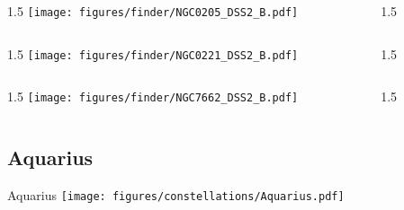 \documentclass[final]{beamer}
\newlength{\colwidth}
\begin{document}
\begin{frame}[t]{}
  \begin{columns}[T]
    \begin{column}{1.5\colwidth}
      \centering
      \texttt{[image: figures/finder/NGC0205\_DSS2\_B.pdf]}
    \end{column}
    \begin{column}{1.5\colwidth}
      \Large
      
    \end{column}
  \end{columns}
  \vspace{\fill}
  \begin{columns}[T]
    \begin{column}{1.5\colwidth}
      \centering
      \texttt{[image: figures/finder/NGC0221\_DSS2\_B.pdf]}
    \end{column}
    \begin{column}{1.5\colwidth}
      \Large
      
    \end{column}
  \end{columns}
\end{frame}


\begin{frame}[t]{}
  \begin{columns}[T]
    \begin{column}{1.5\colwidth}
      \centering
      \texttt{[image: figures/finder/NGC7662\_DSS2\_B.pdf]}
    \end{column}
    \begin{column}{1.5\colwidth}
      \Large
      
    \end{column}
  \end{columns}
  \vspace{\fill}
\end{frame}

\subsection{Aquarius}

\begin{frame}[t]{\LARGE Aquarius}
  \centering
  \texttt{[image: figures/constellations/Aquarius.pdf]}
\end{frame}
\end{document}
